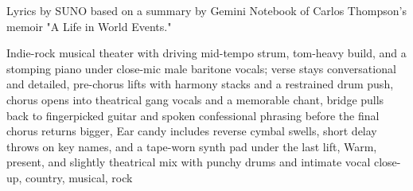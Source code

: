 
\begin{notes}
Lyrics by SUNO based on a summary by Gemini Notebook of Carlos Thompson's memoir "A Life in World Events."
\end{notes}
\begin{style}
Indie-rock musical theater with driving mid-tempo strum, tom-heavy build, and a stomping piano under close-mic male baritone vocals; verse stays conversational and detailed, pre-chorus lifts with harmony stacks and a restrained drum push, chorus opens into theatrical gang vocals and a memorable chant, bridge pulls back to fingerpicked guitar and spoken confessional phrasing before the final chorus returns bigger, Ear candy includes reverse cymbal swells, short delay throws on key names, and a tape-worn synth pad under the last lift, Warm, present, and slightly theatrical mix with punchy drums and intimate vocal close-up, country, musical, rock
\end{style}
